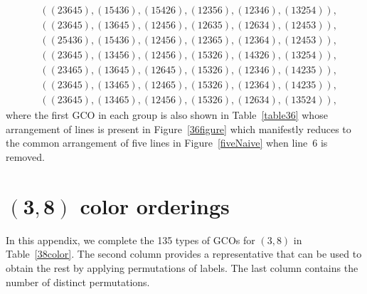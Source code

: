 \documentclass[pdftex]{sigma}
\theoremstyle{definition}
\numberwithin{equation}{section}
\begin{document}
\begin{align}
\nonumber
\\
&
((23645),(15436),(15426),(12356),(12346),(13254)),
\nonumber\\
& ((23645),(13645),(12456),(12635),(12634),(12453)),
\nonumber
\\
&
((25436),(15436),(12456),(12365),(12364),(12453)),
\nonumber\\
& ((23645),(13456),(12456),(15326),(14326),(13254)),
\nonumber
\\
&
((23465),(13645),(12645),(15326),(12346),(14235)),
\nonumber\\
& ((23645),(13465),(12465),(15326),(12364),(14235)),
\nonumber
\\[3mm]
&
((23645),(13465),(12456),(15326),(12634),(13524)),
\label{31termseceq}
\end{align}
 where the first GCO in each group is also shown in Table~\ref{table36} whose arrangement of lines is present in Figure~\ref{36figure} which manifestly reduces to the common arrangement of five lines in Figure~\ref{fiveNaive} when line~6 is removed.


\section[(3,8) color orderings]{$\boldsymbol{(3,8)}$ color orderings}\label{38colorfactors}

In this appendix, we complete the
135 types of GCOs for $(3,8)$ in Table~\ref{38color}.
 The second column provides a representative that can be used to obtain the rest by applying permutations of labels. The last column contains the number of distinct permutations.
\end{document}
